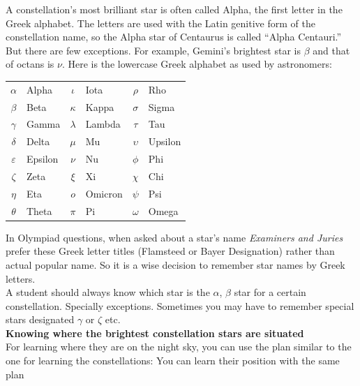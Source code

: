 \documentclass[a4paper,12pt]{extarticle}
\begin{document}
A constellation’s most brilliant star is often called Alpha, the first letter in the Greek alphabet. The letters are used with the Latin genitive form of the constellation name, so the Alpha star of Centaurus is called “Alpha Centauri.” But there are few exceptions. For example, Gemini’s brightest star is $\beta$ and that of octans is $\nu$. Here is the lowercase Greek alphabet as used by astronomers:

\begin{table}[H]
	\centering
	\begin{tabular}{cl@{\qquad}cl@{\qquad}cl}
		$\alpha$      & Alpha   & $\iota$   & Iota    & $\rho$     & Rho     \\
		$\beta$       & Beta    & $\kappa$  & Kappa   & $\sigma$   & Sigma   \\
		$\gamma$      & Gamma   & $\lambda$ & Lambda  & $\tau$     & Tau     \\
		$\delta$      & Delta   & $\mu$     & Mu      & $\upsilon$ & Upsilon \\
		$\varepsilon$ & Epsilon & $\nu$     & Nu      & $\phi$     & Phi     \\
		$\zeta$       & Zeta    & $\xi$     & Xi      & $\chi$     & Chi     \\
		$\eta$        & Eta     & $o$       & Omicron & $\psi$     & Psi     \\
		$\theta$      & Theta   & $\pi$     & Pi      & $\omega$   & Omega   \\
	\end{tabular}
\end{table}


In Olympiad questions, when asked about a star’s name \textit{Examiners and Juries} prefer these Greek letter titles (Flamsteed or Bayer Designation) rather than actual popular name. So it is a wise decision to remember star names by Greek letters.\\

A student should always know which star is the $\alpha$, $\beta$ star for a certain constellation. Specially exceptions. Sometimes you may have to remember special stars designated $\gamma$ or $\zeta$ etc.\\

\textbf{Knowing where the brightest constellation stars are situated}\\

For learning where they are on the night sky, you can use the plan similar to the one for learning the constellations:
You can learn their position with the same plan
\end{document}
